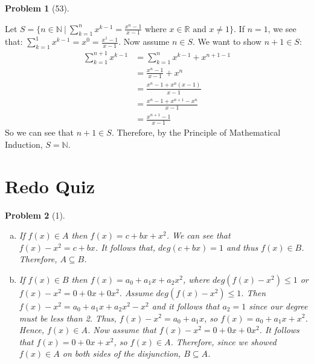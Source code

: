\documentclass{article}
\theoremstyle{problem}
\newtheorem{prob}{Problem}
\theoremstyle{plain}
\begin{document}
\begin{prob}[53]

\end{prob}
Let $S = \{n \in \mathbb{N}\ |\ \displaystyle \sum_{k = 1}^{n}{x^{k-1}}  = \frac{x^n - 1}{x - 1}$ where $x \in \mathbb{R}\text{ and }x \not = 1 \}$.
If $n = 1$, we see that: $\displaystyle \sum_{k = 1}^{1}{x^{k-1}}  = x^0 = \frac{x^1 - 1}{x - 1}$. Now assume $n \in S$. We want to show $n+1 \in S$:
\begin{align*}
\displaystyle \sum_{k = 1}^{n+1}{x^{k-1}}  &= \displaystyle \sum_{k = 1}^{n}{x^{k-1}} + x^{n+1-1}\\
&= \frac{x^n - 1}{x-1} + x^n\\
&= \frac{x^n - 1 + x^n(x - 1)}{x - 1}\\
&= \frac{x^n - 1 + x^{n+1} - x^n}{x - 1}\\
&= \frac{x^{n+1} - 1}{x - 1}
\end{align*}
So we can see that $n + 1 \in S$. Therefore, by the Principle of Mathematical Induction, $S = \mathbb{N}$.

\section*{Redo Quiz}
\begin{prob}[1]\ \\[-1cm]
  \begin{enumerate}[a)]
  \item If $f(x) \in A$ then $f(x) = c + bx + x^2$. We can see that $f(x) - x^2 = c + bx$. It follows that, $deg(c + bx) = 1$ and thus $f(x) \in B$. Therefore, $A \subseteq B$.

  \item If $f(x) \in B$ then $f(x) = a_0 + a_1x + a_2x^2$, where $deg(f(x) - x^2) \leq 1$ or $f(x) - x^2 = 0 + 0x + 0x^2$. Assume $deg(f(x) - x^2) \leq 1$. Then $f(x) - x^2 = a_0 + a_1x + a_2x^2 - x^2$ and it follows that $a_2 = 1$ since our degree must be less than 2. Thus, $f(x) - x^2 = a_0 + a_1x$, so $f(x) = a_0 + a_1x + x^2$. Hence, $f(x) \in A$. Now assume that $f(x) - x^2 = 0 + 0x + 0x^2$. It follows that $f(x) = 0 + 0x + x^2$, so $f(x) \in A$. Therefore, since we showed $f(x) \in A$ on both sides of the disjunction, $B \subseteq A$.
  \end{enumerate}
\end{prob}
\end{document}
